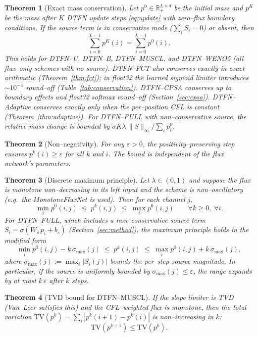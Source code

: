 \documentclass[10pt]{article}
\newtheorem{theorem}{Theorem}
\theoremstyle{definition}
\theoremstyle{remark}
\newcommand{\Rplus}{\mathbb{R}_+}
\newcommand{\Eps}{\varepsilon}
\begin{document}
\begin{theorem}[Exact mass conservation]
  \label{thm:conservation}
  Let $p^0\in\Rplus^{L\times d}$ be the initial mass and $p^K$ be the
  mass after $K$ DTFN update steps \eqref{eq:update} with zero--flux
  boundary conditions.  If the source term is in conservative mode
  ($\sum_i S_i = 0$) or absent, then
  \[
    \sum_{i=0}^{L-1} p^K(i) = \sum_{i=0}^{L-1} p^0(i).
  \]
  This holds for DTFN--U, DTFN--B, DTFN--MUSCL, and DTFN--WENO5
  (all flux--only schemes with no source).  DTFN--FCT also conserves
  exactly in exact arithmetic (Theorem~\ref{thm:fct}); in float32 the
  learned sigmoid limiter introduces $\sim 10^{-4}$ round--off
  (Table~\ref{tab:conservation}).  DTFN--CPSA conserves up to boundary
  effects and float32 softmax round--off (Section~\ref{sec:cpsa}).
  DTFN--Adaptive conserves exactly only when the per--position CFL is
  constant (Theorem~\ref{thm:adaptive}).  For DTFN--FULL with
  non--conservative source, the relative mass change is bounded by
  $\sigma K \lambda \,\|S\|_\infty / \sum_i p^0_i$.
\end{theorem}

\begin{theorem}[Non--negativity]
  \label{thm:nonneg}
  For any $\Eps>0$, the positivity--preserving step ensures
  $p^k(i)\ge \Eps$ for all $k$ and $i$.  The bound is independent of
  the flux network's parameters.
\end{theorem}

\begin{theorem}[Discrete maximum principle]
  \label{thm:maxprinciple}
  Let $\lambda\in(0,1)$ and suppose the flux is monotone non--decreasing
  in its left input and the scheme is non--oscillatory (e.g.\ the
  MonotoneFluxNet is used).  Then for each channel $j$,
  \[
    \min_i p^0(i,j) \;\le\; p^k(i,j) \;\le\; \max_i p^0(i,j)
    \qquad \forall k\ge 0,\;\forall i.
  \]
  For DTFN--FULL, which includes a non--conservative source term
  $S_i = \sigma(W_s\, p_i + b_s)$ (Section~\ref{sec:method}), the
  maximum principle holds in the modified form
  \[
    \min_i p^0(i,j) - k\,\sigma_{\max}(j) \;\le\; p^k(i,j)
    \;\le\; \max_i p^0(i,j) + k\,\sigma_{\max}(j),
  \]
  where $\sigma_{\max}(j) := \max_i |S_i(j)|$ bounds the per--step
  source magnitude.  In particular, if the source is uniformly bounded
  by $\sigma_{\max}(j) \le \varepsilon$, the range expands by at most
  $k\,\varepsilon$ after $k$ steps.
\end{theorem}

\begin{theorem}[TVD bound for DTFN--MUSCL]
  \label{thm:tvd}
  If the slope limiter is TVD (Van~Leer satisfies this) and the
  CFL--weighted flux is monotone, then the total variation
  $\mathrm{TV}(p^k) = \sum_i |p^k(i+1) - p^k(i)|$ is non--increasing
  in $k$:
  \[
    \mathrm{TV}(p^{k+1}) \le \mathrm{TV}(p^k).
  \]
\end{theorem}
\end{document}

